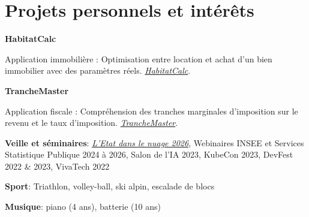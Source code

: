 \documentclass[a4paper,10pt]{article}
\newlength{\spaceItemEnd}\setlength{\spaceItemEnd}{-0.8pt}
\newlength{\spaceSubItem}\setlength{\spaceSubItem}{-4pt}
\newlength{\spaceJobMission}\setlength{\spaceJobMission}{3pt}
\newlength{\spaceProjSec}\setlength{\spaceProjSec}{0.5mm}
\newcommand{\resumeItem}[2]{
  \item\small{
    \textbf{#1}{: #2\vspace{\spaceItemEnd}}
  }
}
\newcommand{\resumeSubItem}[2]{
    \small{\resumeItem{#1}{#2}\vspace{\spaceSubItem}}
	
}
\newcommand{\resumeSubHeadingListStart}{\begin{itemize}[leftmargin=*]}
\newcommand{\resumeSubHeadingListEnd}{\end{itemize}}
\newcommand{\resumeJobMission}[2]{
    \item\small{
        \textbf{#1} \\ 
        \begin{minipage}{0.95\textwidth}
            \small{#2}
        \end{minipage}
    }
    \vspace{\spaceJobMission}
}
\begin{document}
\section{Projets personnels et int\'er\^ets}
\vspace{\spaceProjSec}
\begin{minipage}[t]{0.9865\textwidth}
\resumeSubHeadingListStart

\resumeJobMission    {HabitatCalc}    {Application immobili\`ere : Optimisation entre location et achat d'un bien immobilier avec des param\`etres r\'eels. \href{https://odysseu.github.io/HabitatCalc/}{\textit{HabitatCalc}}.}
\resumeJobMission    {TrancheMaster}    {Application fiscale : Compr\'ehension des tranches marginales d'imposition sur le revenu et le taux d'imposition. \href{https://odysseu.github.io/TrancheMaster/}{\textit{TrancheMaster}}.}
  \resumeSubItem{Veille et s\'eminaires}{\href{https://www.numerique.gouv.fr/agenda/etat-dans-le-nuage-2026/}{\textit{L'Etat dans le nuage 2026}}, Webinaires INSEE et Services Statistique Publique 2024 \`a 2026, Salon de l'IA 2023, KubeCon 2023, DevFest 2022 \& 2023, VivaTech 2022}
  \resumeSubItem{Sport}{Triathlon, volley-ball, ski alpin, escalade de blocs}
  \resumeSubItem{Musique}{piano (4 ans), batterie (10 ans)}
\resumeSubHeadingListEnd
\end{minipage}


\end{document}
